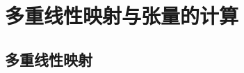 \chapter{多重线性映射与张量的计算}

\section{多重线性映射}

\begin{summary}

\end{summary}

\begin{exercise}

    \begin{exgroup}
        \item
    \end{exgroup}

    \begin{exgroup}
        \item
    \end{exgroup}

    \begin{exgroup}
        \item
    \end{exgroup}
\end{exercise}
